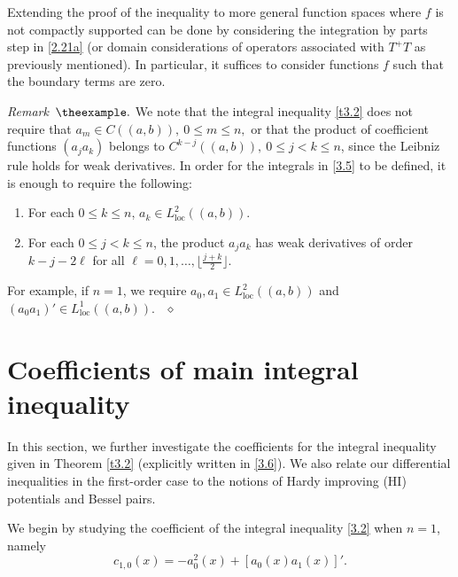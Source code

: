 \documentclass[reqno,10pt,centertags]{amsart}
\newcommand{\lb}{\label}
\newcounter{count}
\numberwithin{equation}{section}
\theoremstyle{remark}
\newenvironment{remark}[1][]{\refstepcounter{theorem}\par\medskip\noindent\textit{Remark~$\theexample. #1$} \rmfamily}{{\ }\hfill $\diamond$ \vspace{6pt}}%
\begin{document}
Extending the proof of the inequality to more general function spaces where $f$ is not compactly supported can be done by considering the integration by parts step in \eqref{2.21a} (or domain considerations of operators associated with $T^+T$ as previously mentioned). In particular, it suffices to consider functions $f$ such that the boundary terms are zero.

\begin{remark}\label{rem2.4}
We note that the integral inequality \eqref{t3.2} does not require that $a_m\in C((a,b)),\ 0\leq m\leq n,$ or that the product of coefficient functions $(a_j a_k)$ belongs to $C^{k-j}((a,b)),\ 0\leq j<k\leq n$, since the Leibniz rule holds for weak derivatives. In order for the integrals in \eqref{3.5} to be defined, it is enough to require the following:
    \begin{enumerate}
        \item[$(a)$] For each $0 \leq k \leq n$, $a_k \in L^2_{\text{loc}}((a,b))$.
        \item[$(b)$] For each $0\leq j<k \leq n$, the product $a_ja_k$ has weak derivatives of order $k-j-2\ell$ for all $\ell = 0,1,\dots,\lfloor \frac{j+k}{2}\rfloor$.
    \end{enumerate}
    For example, if $n = 1$, we require $a_0,a_1\in L^2_{\text{loc}}((a,b))$ and $(a_0a_1)' \in L^1_{\text{loc}}((a,b))$. 
\end{remark}

\section{Coefficients of main integral inequality}\lb{s3}

In this section, we further investigate the coefficients for the integral inequality given in Theorem \ref{t3.2} (explicitly written in \eqref{3.6}). We also relate our differential inequalities in the first-order case to the notions of Hardy improving (HI) potentials and Bessel pairs.

We begin by studying the coefficient of the integral inequality \eqref{3.2} when $n=1$, namely
\begin{equation}\label{4.1}
c_{1,0}(x)=-a_0^2(x)+[a_0(x)a_1(x)]'.
\end{equation}
\end{document}
